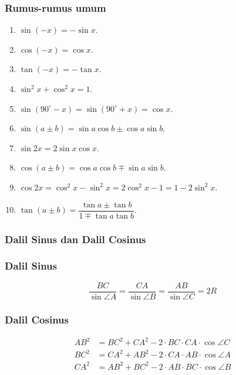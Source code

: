 \documentclass[11pt]{scrartcl}
\begin{document}
\subsubsection{Rumus-rumus umum}
\begin{enumerate}
    \item $\sin (-x) = -\sin x$.
    \item $\cos (-x) = \cos x$.
    \item $\tan(-x) = -\tan x$.
    \item $\sin^2 x + \cos^2 x = 1$.
    \item $\sin(90^\circ-x)=\sin(90^\circ+x)=\cos x$.
    \item $\sin(a \pm b) = \sin a \cos b \pm \cos a \sin b$.
    \item $\sin 2x = 2\sin x \cos x$.
    \item $\cos(a \pm b) = \cos a \cos b \mp \sin a \sin b$.
    \item $\cos 2x = \cos^2 x - \sin^2 x = 2\cos^2 x -1 = 1-2\sin^2 x$.
    \item $\tan(a \pm b) = \dfrac{\tan a \pm \tan b}{1 \mp \tan a \tan b}$.
\end{enumerate}

\subsubsection{Dalil Sinus dan Dalil Cosinus}
\begin{center}
\end{center}
    \subsubsection{Dalil Sinus}
    $$\dfrac{BC}{\sin \angle A} = \dfrac{CA}{\sin \angle B}= \dfrac{AB}{\sin \angle C} = 2R$$
    
    \subsubsection{Dalil Cosinus}
    \begin{align*}
        AB^2 &= BC^2 + CA^2 - 2\cdot BC \cdot CA \cdot \cos \angle C\\
        BC^2 &= CA^2 + AB^2 - 2\cdot CA \cdot AB \cdot \cos \angle A\\
        CA^2 &= AB^2 + BC^2 - 2\cdot AB \cdot BC \cdot \cos \angle B
    \end{align*}
\end{document}
